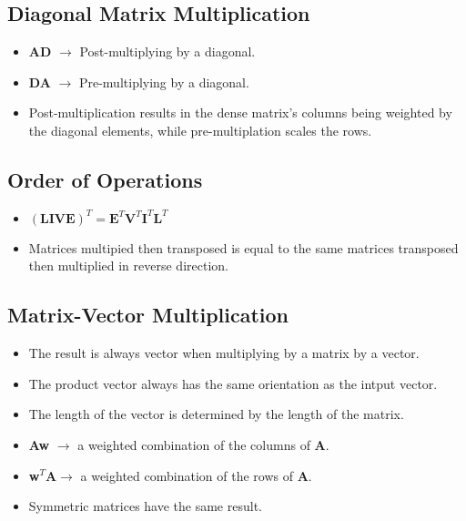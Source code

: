 \documentclass[12pt,a4paper]{article}
\begin{document}
\subsection{Diagonal Matrix Multiplication}
\begin{itemize}
    \item \textbf{A{\color{o-Sun}D}} \(\rightarrow\) Post-multiplying by a diagonal.
    \item \textbf{{\color{o-Sun}D}A} \(\rightarrow\) Pre-multiplying by a diagonal.
    \item Post-multiplication results in the dense matrix's columns being weighted by the diagonal elements, while pre-multiplation scales the rows.
\end{itemize}

\subsection{Order of Operations}
\begin{itemize}
    \item \((\textbf{LIVE})^T = \textbf{E}^T\textbf{V}^T\textbf{I}^T\textbf{L}^T\)
    \item Matrices multipied then transposed is equal to the same matrices transposed then multiplied in reverse direction.
\end{itemize}

\subsection{Matrix-Vector Multiplication}
\begin{itemize}
    \item The result is always vector when multiplying by a matrix by a vector.
    \item The product vector always has the same orientation as the intput vector.
    \item The length of the vector is determined by the length of the matrix. 
    \item \textbf{Aw} \(\rightarrow\) a weighted combination of the {\color{o-Sun}columns} of \textbf{A}.
    \item \textbf{w}\(^{T}\textbf{A} \rightarrow\) a weighted combination of the {\color{o-Sun}rows} of \textbf{A}.
    \item Symmetric matrices have the same result.
\end{itemize}
\end{document}
